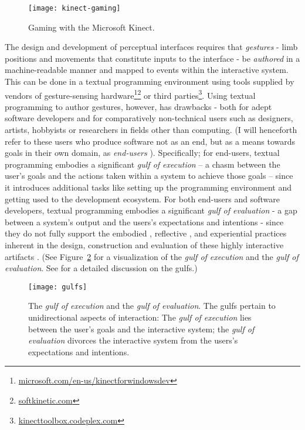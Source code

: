 \begin{figure}[ht]
\centering
\texttt{[image: kinect-gaming]}
\caption{Gaming with the Microsoft Kinect.}
\label{fig:kinect-gaming}
\end{figure}

The design and development of perceptual interfaces requires that \emph{gestures} - limb positions and movements that constitute inputs to the interface - be \emph{authored} in a machine-readable manner and mapped to events within the interactive system. This can be done in a textual programming environment using tools supplied by vendors of gesture-sensing hardware\footnote{\href{http://www.microsoft.com/en-us/kinectforwindowsdev/}{microsoft.com/en-us/kinectforwindowsdev}}\footnote{\href{http://www.softkinetic.com}{softkinetic.com}} or third parties\footnote{\href{http://kinecttoolbox.codeplex.com}{kinecttoolbox.codeplex.com}}. Using textual programming to author gestures, however, has drawbacks - both for adept software developers and for comparatively non-technical users such as designers, artists, hobbyists or researchers in fields other than computing. (I will henceforth refer to these users who produce software not as an end, but as a means towards goals in their own domain, as \emph{end-users} \parencite{Ko:2011}). Specifically; for end-users, textual programming embodies a significant \emph{gulf of execution} – a chasm between the user's goals and the actions taken within a system to achieve those goals – since it introduces additional tasks like setting up the programming environment and getting used to the development ecosystem. For both end-users and software developers, textual programming embodies a significant \emph{gulf of evaluation} - a gap between a system's output and the users's expectations and intentions - since they do not fully support the embodied \parencite{Dourish:2004},  reflective \parencite{Schon:1984}, and experiential \parencite{Lindell:2014} practices inherent in the design, construction and evaluation \parencite{Hartmann:2006} of these highly interactive artifacts \parencite{Myers:2000, Lim:2008}. (See Figure~\ref{fig:gulfs} for a visualization of the \emph{gulf of execution} and the \emph{gulf of evaluation}. See \parencite{Norman:1986, Norman:2002} for a detailed discussion on the gulfs.)

\begin{figure}[ht]
\centering
\texttt{[image: gulfs]}
\caption{The \emph{gulf of execution} and the \emph{gulf of evaluation}. The gulfs pertain to unidirectional aspects of interaction: The \emph{gulf of execution} lies between the user's goals and the interactive system; the \emph{gulf of evaluation} divorces the interactive system from the users's expectations and intentions.}
\label{fig:gulfs}
\end{figure}

